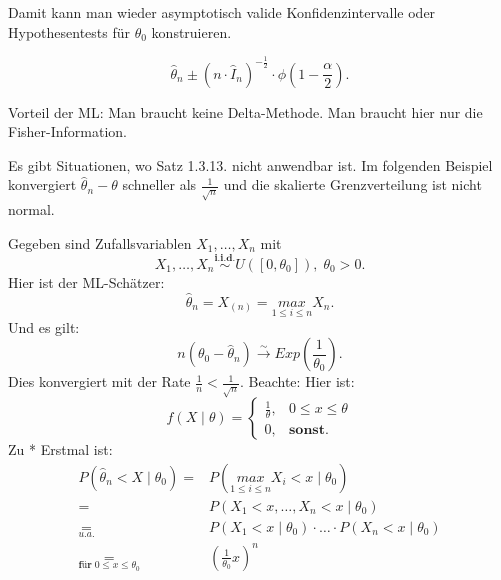\documentclass[10pt]{article}
\newcommand{\FZV}{X_1, \ldots, X_n} %
\newcommand{\KV}{\overset{\sim} \longrightarrow} %
\newcommand{\eqname}[1]{\tag*{#1}}%
\newenvironment{BSP}[1][]
{\begin{Beispiel}[frametitle=#1]}{\end{Beispiel}}
\begin{document}
	Damit kann man wieder asymptotisch valide Konfidenzintervalle oder Hypothesentests für $\theta_0$ konstruieren. 
	\begin{BSP}[Konfidenzintervall für $\theta_0$]
		\begin{equation*}
			\hat{\theta}_n \pm (n \cdot \hat{I}_n)^{-\frac{1}{2}} \cdot \phi\left(1-\frac{\alpha}{2}\right).
		\end{equation*}
	\end{BSP}
	Vorteil der ML: Man braucht keine Delta-Methode. Man braucht hier nur die Fisher-Information. 
	
	Es gibt Situationen, wo Satz 1.3.13. nicht anwendbar ist. Im folgenden Beispiel konvergiert $\hat{\theta}_n - \theta$ schneller als $\frac{1}{\sqrt{n}}$ und die skalierte Grenzverteilung ist nicht normal. 
	
	\begin{BSP}[Beispiel Grenzverteilung keine Normalverteilung]
		Gegeben sind Zufallsvariablen $\FZV$ mit
		\begin{equation*}
			\FZV \overset{\textbf{i.i.d.}}{\sim} U([0,\theta_0]), \; \theta_0 >0.
		\end{equation*}
		Hier ist der ML-Schätzer:
		\begin{equation*}
			\hat{\theta}_n = X_{(n)} = \underset{1\leq i \leq n}{max} X_n. 
		\end{equation*}
		Und es gilt:
		\begin{equation*}
			n(\theta_0-\hat{\theta}_n) \KV Exp\left(\frac{1}{\theta_0}\right) \eqname{*}.
		\end{equation*}
		Dies konvergiert mit der Rate $\frac{1}{n} < \frac{1}{\sqrt{n}}$.
		Beachte: Hier ist:
		\begin{equation*}
			f(X\mid \theta) =
			\begin{cases}
				\frac{1}{\theta}, &0\leq x\leq \theta\\
				0, &\textbf{sonst}.
			\end{cases}
		\end{equation*}
		Zu * Erstmal ist:
		\begin{equation*}
			\begin{split}
				P(\hat{\theta}_n < X \mid \theta_0) =& P(\underset{1\leq i \leq n}{max} X_i < x \mid \theta_0)\\
				=& P(X_1 < x, \ldots, X_n < x \mid \theta_0)\\
				\underset{u.a.}=& P(X_1<x\mid \theta_0) \cdot \ldots \cdot P(X_n < x \mid \theta_0)\\
				\underset{\textbf{für} \; 0 \leq x \leq \theta_0}=& \left(\frac{1}{\theta_0}x\right)^{n}\\

\end{split}
\end{equation*}
\end{BSP}
\end{document}
